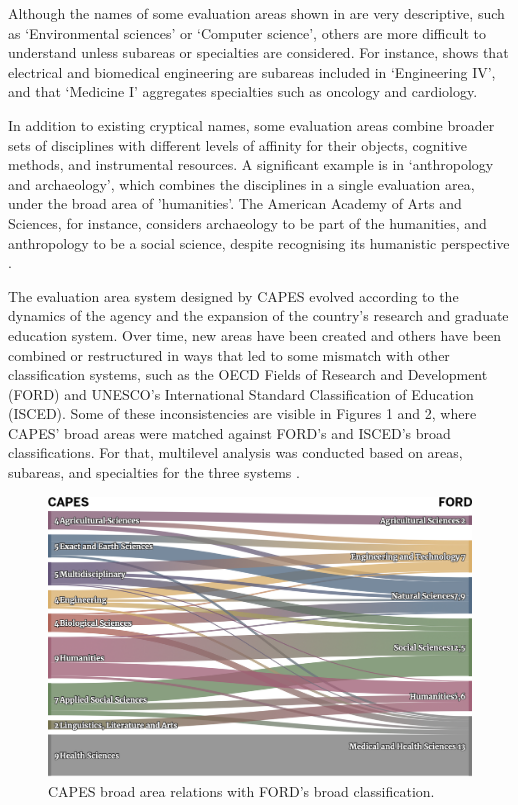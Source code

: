 Although the names of some evaluation areas shown in  are very descriptive, such as ‘Environmental sciences’ or ‘Computer science’, others are more difficult to understand unless subareas or specialties are considered. For instance, \textcite{CAPES.2020tb} shows that electrical and biomedical engineering are subareas included in ‘Engineering IV’, and that ‘Medicine I’ aggregates specialties such as oncology and cardiology. 

In addition to existing cryptical names, some evaluation areas combine broader sets of disciplines with different levels of affinity for their objects, cognitive methods, and instrumental resources. A significant example is in ‘anthropology and archaeology’, which combines the disciplines in a single evaluation area, under the broad area of 'humanities'. The American Academy of Arts and Sciences, for instance, considers archaeology to be part of the humanities, and anthropology to be a social science, despite recognising its humanistic perspective \autocite{AAAS.2022}. 

The evaluation area system designed by CAPES evolved according to the dynamics of the agency and the expansion of the country's research and graduate education system. Over time, new areas have been created and others have been combined or restructured in ways that led to some mismatch with other classification systems, such as the OECD Fields of Research and Development (FORD) and UNESCO’s International Standard Classification of Education (ISCED). Some of these inconsistencies are visible in Figures 1 and 2, where CAPES’ broad areas were matched against FORD’s and ISCED’s broad classifications. For that, multilevel analysis was conducted based on areas, subareas, and specialties for the three systems \autocite{OECD.2015fr, UNESCO.2015, CAPES.2020tb}.

\begin{figure}[ht]
\vspace{8pt}
    \centering
    \includegraphics[width=1\textwidth]{images/chapter_classific/capes_oecd.png}
    \caption{CAPES broad area relations with FORD’s broad classification.}
    \label{fig:classif:capes_ford}
\end{figure}

